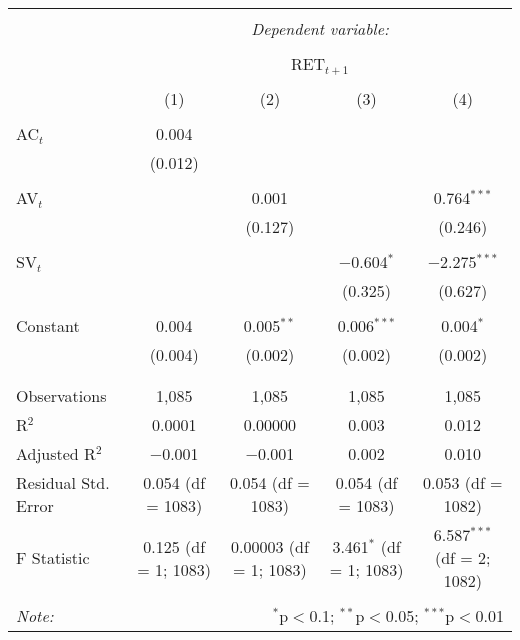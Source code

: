 
\begin{table}[!htbp] \centering 
  \caption{} 
  \label{} 
\begin{tabular}{@{\extracolsep{5pt}}lcccc} 
\\[-1.8ex]\hline 
\hline \\[-1.8ex] 
 & \multicolumn{4}{c}{\textit{Dependent variable:}} \\ 
\cline{2-5} 
\\[-1.8ex] & \multicolumn{4}{c}{RET$_{t+1}$} \\ 
\\[-1.8ex] & (1) & (2) & (3) & (4)\\ 
\hline \\[-1.8ex] 
 AC$_{t}$ & 0.004 &  &  &  \\ 
  & (0.012) &  &  &  \\ 
  & & & & \\ 
 AV$_{t}$ &  & 0.001 &  & 0.764$^{***}$ \\ 
  &  & (0.127) &  & (0.246) \\ 
  & & & & \\ 
 SV$_{t}$ &  &  & $-$0.604$^{*}$ & $-$2.275$^{***}$ \\ 
  &  &  & (0.325) & (0.627) \\ 
  & & & & \\ 
 Constant & 0.004 & 0.005$^{**}$ & 0.006$^{***}$ & 0.004$^{*}$ \\ 
  & (0.004) & (0.002) & (0.002) & (0.002) \\ 
  & & & & \\ 
\hline \\[-1.8ex] 
Observations & 1,085 & 1,085 & 1,085 & 1,085 \\ 
R$^{2}$ & 0.0001 & 0.00000 & 0.003 & 0.012 \\ 
Adjusted R$^{2}$ & $-$0.001 & $-$0.001 & 0.002 & 0.010 \\ 
Residual Std. Error & 0.054 (df = 1083) & 0.054 (df = 1083) & 0.054 (df = 1083) & 0.053 (df = 1082) \\ 
F Statistic & 0.125 (df = 1; 1083) & 0.00003 (df = 1; 1083) & 3.461$^{*}$ (df = 1; 1083) & 6.587$^{***}$ (df = 2; 1082) \\ 
\hline 
\hline \\[-1.8ex] 
\textit{Note:}  & \multicolumn{4}{r}{$^{*}$p$<$0.1; $^{**}$p$<$0.05; $^{***}$p$<$0.01} \\ 
\end{tabular} 
\end{table} 
